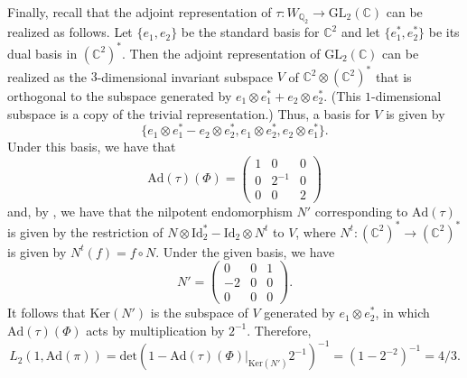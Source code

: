 \documentclass[11pt]{amsart}
\newcommand{\Q}{\mathbb{Q}}
\newcommand{\C}{\mathbb{C}}
\newcommand{\GL}{\mathrm{GL}}
\theoremstyle{definition}
\theoremstyle{remark}
\begin{document}
Finally, recall that the adjoint representation of $\tau:W_{\Q_2} \rightarrow \GL_2(\C)$ can be realized as follows. Let $\{e_1, e_2\}$ be the standard basis for $\C^2$ and let $\{e_{1}^{*}, e_{2}^{*}\}$ be its dual basis in $(\C^2)^{*}$. Then the adjoint representation of $\GL_2(\C)$ can be realized as the $3$-dimensional invariant subspace $V$ of $\C^2 \otimes (\C^2)^{*}$ that is orthogonal to the subspace generated by $e_1\otimes e_1^{*} + e_2 \otimes e_2^{*}$. (This $1$-dimensional subspace is a copy of the trivial representation.) Thus, a basis for $V$ is given by $$ \{e_1\otimes e_1^{*} - e_2\otimes e_2^{*}, e_1\otimes e_2^{*}, e_2\otimes e_1^{*} \}.$$ Under this basis, we have that $$ \mathrm{Ad}(\tau)(\Phi) = \begin{pmatrix}
    1 & 0 & 0 \\ 0 & 2^{-1} & 0 \\ 0 & 0 & 2
\end{pmatrix} $$ and, by \cite[\S 31.2]{localLanglandsGL2}, we have that the nilpotent endomorphism $N'$ corresponding to $\mathrm{Ad}(\tau)$ is given by the restriction of $N\otimes \mathrm{Id}_{2}^{*} - \mathrm{Id}_{2}\otimes N^{t}$ to $V$, where $N^{t}:(\C^{2})^{*} \rightarrow (\C^2)^{*}$ is given by $N^{t}(f) = f\circ N$. Under the given basis, we have $$ N' = \begin{pmatrix}
    0 & 0 & 1 \\ -2 & 0 & 0 \\ 0 & 0 & 0
\end{pmatrix}.$$ It follows that $\mathrm{Ker}(N')$ is the subspace of $V$ generated by $e_1\otimes e_2^{*}$, in which $\mathrm{Ad}(\tau)(\Phi)$ acts by multiplication by $2^{-1}$. Therefore, $$ L_2(1,\mathrm{Ad}(\pi)) = \mathrm{det}\left( 1-\mathrm{Ad}(\tau)(\Phi)|_{\mathrm{Ker}(N')} 2^{-1} \right)^{-1} = (1-2^{-2})^{-1} = 4/3.$$
\end{document}

